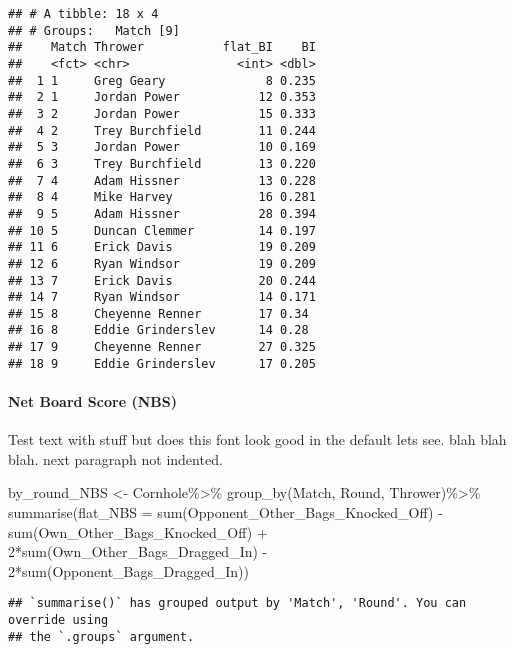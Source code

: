 \documentclass[
]{article}
\newenvironment{Shaded}{\begin{snugshade}}{\end{snugshade}}
\newcommand{\AttributeTok}[1]{\textcolor[rgb]{0.77,0.63,0.00}{#1}}
\newcommand{\DecValTok}[1]{\textcolor[rgb]{0.00,0.00,0.81}{#1}}
\newcommand{\FunctionTok}[1]{\textcolor[rgb]{0.00,0.00,0.00}{#1}}
\newcommand{\NormalTok}[1]{#1}
\newcommand{\OtherTok}[1]{\textcolor[rgb]{0.56,0.35,0.01}{#1}}
\newcommand{\SpecialCharTok}[1]{\textcolor[rgb]{0.00,0.00,0.00}{#1}}
\begin{document}
\begin{verbatim}
## # A tibble: 18 x 4
## # Groups:   Match [9]
##    Match Thrower           flat_BI    BI
##    <fct> <chr>               <int> <dbl>
##  1 1     Greg Geary              8 0.235
##  2 1     Jordan Power           12 0.353
##  3 2     Jordan Power           15 0.333
##  4 2     Trey Burchfield        11 0.244
##  5 3     Jordan Power           10 0.169
##  6 3     Trey Burchfield        13 0.220
##  7 4     Adam Hissner           13 0.228
##  8 4     Mike Harvey            16 0.281
##  9 5     Adam Hissner           28 0.394
## 10 5     Duncan Clemmer         14 0.197
## 11 6     Erick Davis            19 0.209
## 12 6     Ryan Windsor           19 0.209
## 13 7     Erick Davis            20 0.244
## 14 7     Ryan Windsor           14 0.171
## 15 8     Cheyenne Renner        17 0.34 
## 16 8     Eddie Grinderslev      14 0.28 
## 17 9     Cheyenne Renner        27 0.325
## 18 9     Eddie Grinderslev      17 0.205
\end{verbatim}

\hypertarget{net-board-score-nbs}{%
\paragraph{Net Board Score (NBS)}\label{net-board-score-nbs}}

Test text with stuff but does this font look good in the default lets
see. blah blah blah. next paragraph not indented.

\begin{Shaded}
\begin{Highlighting}[]
\NormalTok{by\_round\_NBS }\OtherTok{\textless{}{-}}\NormalTok{ Cornhole}\SpecialCharTok{\%\textgreater{}\%}
  \FunctionTok{group\_by}\NormalTok{(Match, Round, Thrower)}\SpecialCharTok{\%\textgreater{}\%}
  \FunctionTok{summarise}\NormalTok{(}\AttributeTok{flat\_NBS =} \FunctionTok{sum}\NormalTok{(Opponent\_Other\_Bags\_Knocked\_Off) }\SpecialCharTok{{-}} \FunctionTok{sum}\NormalTok{(Own\_Other\_Bags\_Knocked\_Off) }\SpecialCharTok{+} \DecValTok{2}\SpecialCharTok{*}\FunctionTok{sum}\NormalTok{(Own\_Other\_Bags\_Dragged\_In) }\SpecialCharTok{{-}} \DecValTok{2}\SpecialCharTok{*}\FunctionTok{sum}\NormalTok{(Opponent\_Bags\_Dragged\_In))}
\end{Highlighting}
\end{Shaded}

\begin{verbatim}
## `summarise()` has grouped output by 'Match', 'Round'. You can override using
## the `.groups` argument.
\end{verbatim}
\end{document}
